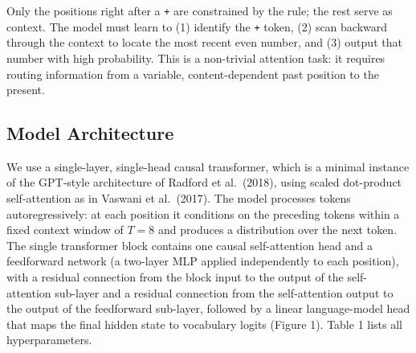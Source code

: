 \documentclass[
  11pt,
  a4paper,
]{article}
\begin{document}
Only the positions right after a \texttt{+} are constrained by the rule;
the rest serve as context. The model must learn to (1) identify the
\texttt{+} token, (2) scan backward through the context to locate the
most recent even number, and (3) output that number with high
probability. This is a non-trivial attention task: it requires routing
information from a variable, content-dependent past position to the
present.

\subsection{Model Architecture}\label{model-architecture}

We use a single-layer, single-head causal transformer, which is a
minimal instance of the GPT-style architecture of Radford et al.~(2018),
using scaled dot-product self-attention as in Vaswani et al.~(2017). The
model processes tokens autoregressively: at each position it conditions
on the preceding tokens within a fixed context window of \(T = 8\) and
produces a distribution over the next token. The single transformer
block contains one causal self-attention head and a feedforward network
(a two-layer MLP applied independently to each position), with a
residual connection from the block input to the output of the
self-attention sub-layer and a residual connection from the
self-attention output to the output of the feedforward sub-layer,
followed by a linear language-model head that maps the final hidden
state to vocabulary logits (Figure 1). Table 1 lists all
hyperparameters.
\end{document}
